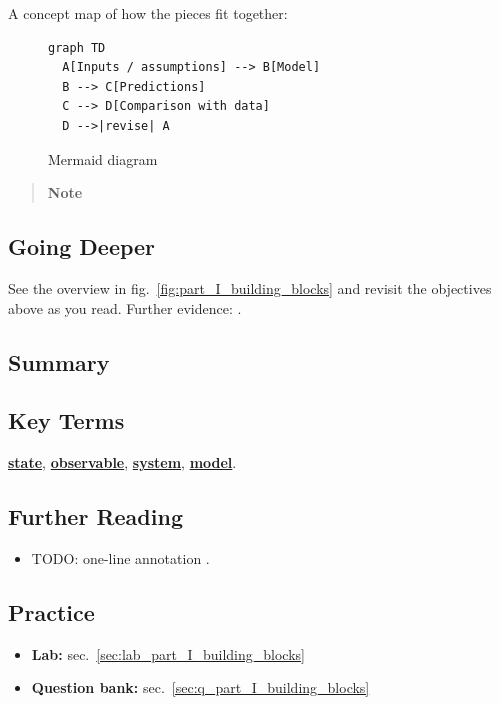\documentclass[
]{article}
\providecommand{\tightlist}{%
  \setlength{\itemsep}{0pt}\setlength{\parskip}{0pt}}
\theoremstyle{plain}
\theoremstyle{definition}
\begin{document}
A concept map of how the pieces fit together:

\begin{figure}[htbp]
\centering
\begin{verbatim}
graph TD
  A[Inputs / assumptions] --> B[Model]
  B --> C[Predictions]
  C --> D[Comparison with data]
  D -->|revise| A
\end{verbatim}
\caption{Mermaid diagram}
\end{figure}

\begin{quote}
\textbf{Note}
\end{quote}

\subsection{Going Deeper}\label{going-deeper-3}

See the overview in fig.~\ref{fig:part_I_building_blocks} and revisit
the objectives above as you read. Further evidence:
\citep{taylor2019theory, smith2020foundations}.

\subsection{Summary}\label{summary-4}

\subsection{Key Terms}\label{key-terms-4}

\hyperref[gl:state]{\textbf{state}},
\hyperref[gl:observable]{\textbf{observable}},
\hyperref[gl:system]{\textbf{system}},
\hyperref[gl:model]{\textbf{model}}.

\subsection{Further Reading}\label{further-reading-4}

\begin{itemize}
\item
  TODO: one-line annotation \citep{doe2019methods}.
\end{itemize}

\subsection{Practice}\label{practice-4}

\begin{itemize}
\tightlist
\item
  \textbf{Lab:} sec.~\ref{sec:lab_part_I_building_blocks}
\item
  \textbf{Question bank:} sec.~\ref{sec:q_part_I_building_blocks}
\end{itemize}
\end{document}

